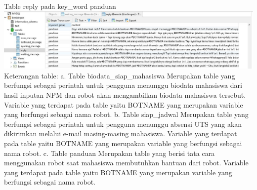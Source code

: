 \documentclass{article}
\newcounter{saveenumi}
\newcommand{\seti}{\setcounter{saveenumi}{\value{enumi}}} %
\begin{document}
\begin{enumerate}
			Table reply pada key\_word panduan
			\newline
			\includegraphics[scale=0.4]{37.3.jpg}
			\newline
			Keterangan table:
			\newline
			a.	 Table biodata\_siap\_mahasiswa
			Merupakan table yang berfungsi sebagai perintah untuk pengguna menunggu biodata mahasiswa dari hasil inputan NPM dan robot akan mengambilkan biodata mahasiswa tersebut. Variable yang terdapat pada table yaitu BOTNAME yang merupakan variable yang berfungsi sebagai nama robot.
			\newline
			b.	Table siap\_jadwal
			Merupakan table yang berfungsi sebagai perintah untuk pengguna menunggu absensi UTS yang akan dikirimkan melalui e-mail masing-masing mahasiswa. Variable yang terdapat pada table yaitu BOTNAME yang merupakan variable yang berfungsi sebagai nama robot.
			\newline
			c.	Table panduan
			Merupakan table yang berisi tata cara menggunakan robot saat mahasiswa membutuhkan bantuan dari robot. Variable yang terdapat pada table yaitu BOTNAME yang merupakan variable yang berfungsi sebagai nama robot.
			\seti %
		\end{enumerate}
\end{document}
